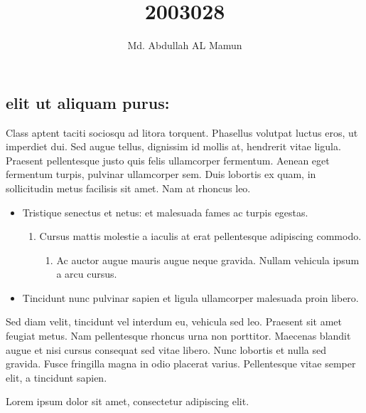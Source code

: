 \documentclass{book}
\title{2003028}
\author{Md. Abdullah AL Mamun}
\begin{document}
\setlength{\topmargin}{5cm}
\setlength{\rightmargin}{5cm}
\setlength{\leftmargin}{5cm}

\maketitle

\chapter{}
\section {elit ut aliquam purus:}
Class aptent taciti sociosqu ad litora torquent.
Phasellus volutpat luctus eros, ut imperdiet dui.
Sed augue tellus, dignissim id mollis at, hendrerit vitae ligula.
Praesent pellentesque justo quis felis ullamcorper fermentum.
Aenean eget fermentum turpis, pulvinar ullamcorper sem.
Duis lobortis ex quam, in sollicitudin metus facilisis sit amet. Nam at rhoncus leo.

\begin{itemize}
    \item Tristique senectus et netus: et malesuada fames ac turpis egestas.
          \begin{enumerate}
              \item Cursus mattis molestie a iaculis at erat pellentesque adipiscing commodo.
                    \begin{enumerate}
                        \item Ac auctor augue mauris augue neque gravida. Nullam vehicula ipsum a arcu cursus.
                    \end{enumerate}
          \end{enumerate}
    \item Tincidunt nunc pulvinar sapien et ligula ullamcorper malesuada proin libero.
\end{itemize}

Sed diam velit, tincidunt vel interdum eu, vehicula sed leo.
Praesent sit amet feugiat metus. Nam pellentesque rhoncus urna non porttitor.
Maecenas blandit augue et nisi cursus consequat sed vitae libero.
Nunc lobortis et nulla sed gravida. Fusce fringilla magna in odio placerat varius.
Pellentesque vitae semper elit, a tincidunt sapien.

\hspace{3cm} Lorem ipsum dolor sit amet, consectetur adipiscing elit.
\end{document}
